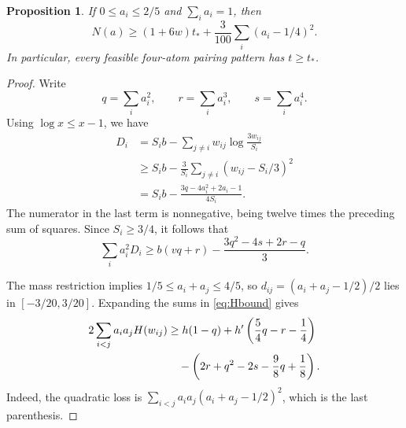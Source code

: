 \documentclass[11pt]{article}
\newtheorem{proposition}[theorem]{Proposition}
\begin{document}
\begin{proposition}\label{prop:four-atoms}
If $0\le a_i\le2/5$ and $\sum_i a_i=1$, then
\begin{equation}\label{eq:stability}
 N(a)\ge(1+6w)t_*+\frac3{100}\sum_i(a_i-1/4)^2.
\end{equation}
In particular, every feasible four-atom pairing pattern has $t\ge t_*$.
\end{proposition}
\begin{proof}
Write
\[
 q=\sum_i a_i^2,\qquad r=\sum_i a_i^3,\qquad s=\sum_i a_i^4.
\]
Using $\log x\le x-1$, we have
\begin{align*}
 D_i
 &=S_i b-\sum_{j\ne i}w_{ij}\log\frac{3w_{ij}}{S_i}\\
 &\ge S_i b-\frac3{S_i}\sum_{j\ne i}(w_{ij}-S_i/3)^2\\
 &=S_i b-\frac{3q-4a_i^2+2a_i-1}{4S_i}.
\end{align*}
The numerator in the last term is nonnegative, being twelve times the
preceding sum of squares. Since $S_i\ge3/4$, it follows that
\begin{equation}\label{eq:diagonal-moments}
 \sum_i a_i^2D_i\ge b(vq+r)-\frac{3q^2-4s+2r-q}{3}.
\end{equation}

The mass restriction implies $1/5\le a_i+a_j\le4/5$, so
$d_{ij}=(a_i+a_j-1/2)/2$ lies in $[-3/20,3/20]$.
Expanding the sums in \eqref{eq:Hbound} gives
\begin{align}
 2\sum_{i<j}a_i a_jH(w_{ij})
 &\ge h(1-q)+h'\left(\frac54q-r-\frac14\right)\notag\\
 &\quad-\left(2r+q^2-2s-\frac98q+\frac18\right).
 \label{eq:offdiag-moments}
\end{align}
Indeed, the quadratic loss is
$\sum_{i<j}a_i a_j(a_i+a_j-1/2)^2$, which is the last parenthesis.


\end{proof}
\end{document}
